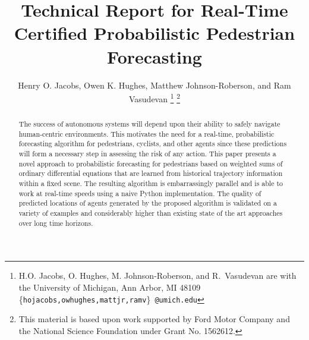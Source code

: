 \documentclass[letterpaper,10pt,conference]{ieeeconf}
\begin{document}
\title{Technical Report for Real-Time Certified Probabilistic Pedestrian Forecasting}

\author{Henry O. Jacobs, Owen K. Hughes, Matthew Johnson-Roberson, and Ram Vasudevan
 \thanks{ H.O. Jacobs, O. Hughes, M. Johnson-Roberson, and R.~Vasudevan are with the University of Michigan, Ann Arbor, MI 48109
{\scriptsize \{\texttt{hojacobs,owhughes,mattjr,ramv}\}~\texttt{@umich.edu}}}
\thanks{This material is based upon work supported by Ford Motor Company and the National Science Foundation under Grant No. 1562612.}
}



\maketitle

\begin{abstract}
The success of autonomous systems will depend upon their ability to safely navigate human-centric environments.
This motivates the need for a real-time, probabilistic forecasting algorithm for pedestrians, cyclists, and other agents since these predictions will form a necessary step in assessing the risk of any action.
This paper presents a novel approach to probabilistic forecasting for pedestrians based on weighted sums of ordinary differential equations that are learned from historical trajectory information within a fixed scene.
The resulting algorithm is embarrassingly parallel and is able to work at real-time speeds using a naive Python implementation.
The quality of predicted locations of agents generated by the proposed algorithm is validated on a variety of examples and considerably higher than existing state of the art approaches over long time horizons.
\end{abstract}
\end{document}
